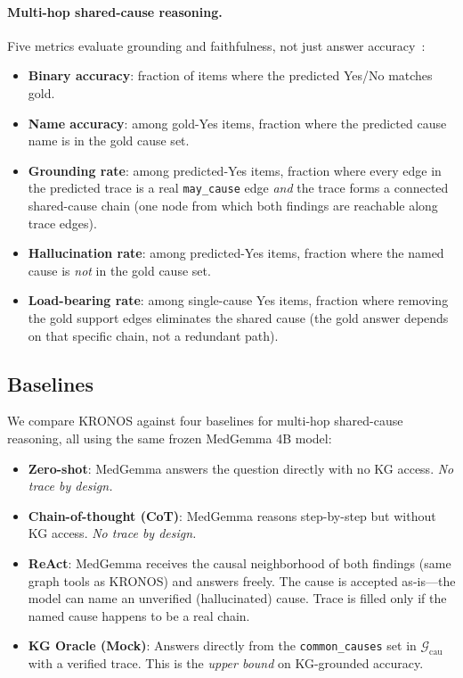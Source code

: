 \documentclass[runningheads]{llncs}
\begin{document}
\paragraph{Multi-hop shared-cause reasoning.}
Five metrics evaluate grounding and faithfulness, not just answer
accuracy~\cite{sun2024thinkongraph}:
\begin{itemize}
  \item \textbf{Binary accuracy}: fraction of items where the predicted
    Yes/No matches gold.
  \item \textbf{Name accuracy}: among gold-Yes items, fraction where the
    predicted cause name is in the gold cause set.
  \item \textbf{Grounding rate}: among predicted-Yes items, fraction where
    every edge in the predicted trace is a real \texttt{may\_cause} edge
    \emph{and} the trace forms a connected shared-cause chain (one node
    from which both findings are reachable along trace edges).
  \item \textbf{Hallucination rate}: among predicted-Yes items, fraction
    where the named cause is \emph{not} in the gold cause set.
  \item \textbf{Load-bearing rate}: among single-cause Yes items, fraction
    where removing the gold support edges eliminates the shared cause
    (the gold answer depends on that specific chain, not a redundant path).
\end{itemize}

\subsection{Baselines}
\label{sec:baselines}

We compare KRONOS against four baselines for multi-hop shared-cause
reasoning, all using the same frozen MedGemma 4B model:

\begin{itemize}
  \item \textbf{Zero-shot}: MedGemma answers the question directly with
    no KG access.
    \emph{No trace by design.}
  \item \textbf{Chain-of-thought (CoT)}: MedGemma reasons step-by-step but
    without KG access.
    \emph{No trace by design.}
  \item \textbf{ReAct}: MedGemma receives the causal neighborhood of both
    findings (same graph tools as KRONOS) and answers freely.
    The cause is accepted as-is---the model can name an unverified
    (hallucinated) cause.
    Trace is filled only if the named cause happens to be a real chain.
  \item \textbf{KG Oracle (Mock)}: Answers directly from the
    \texttt{common\_causes} set in $\mathcal{G}_{\text{cau}}$ with a
    verified trace.
    This is the \emph{upper bound} on KG-grounded accuracy.
\end{itemize}
\end{document}
